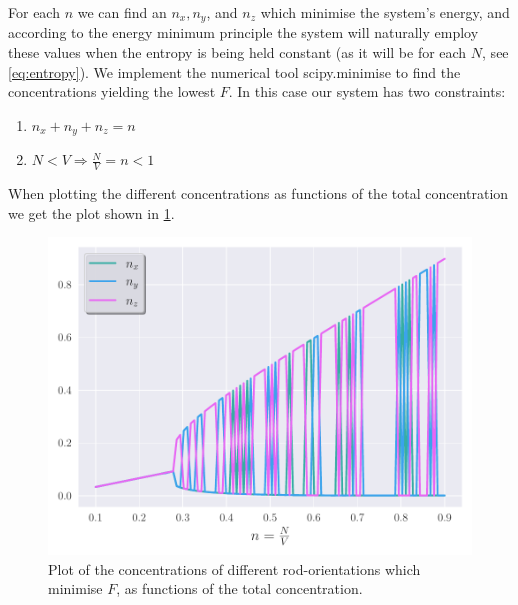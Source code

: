     For each $n$ we can find an $n_x, n_y$, and $n_z$ which minimise the system's energy, and according to the energy minimum principle the system will naturally employ these values when the entropy is being held constant (as it will be for each $N$, see \cref{eq:entropy}). We implement the numerical tool scipy.minimise to find the concentrations yielding the lowest $F$. In this case our system has two constraints:
    \begin{enumerate}
        \item $n_x + n_y + n_z = n$
        \item $ N<V  \Rightarrow \frac{N}{V} = n < 1$
    \end{enumerate}

    When plotting the different concentrations as functions of the total concentration we get the plot shown in \cref{fig:n_vs_xyz}. 
    \begin{figure}
        \centering
        \includegraphics[width=.7\textwidth]{./figs/n_vs_xyz.pdf}
        \caption{Plot of the concentrations of different rod-orientations which minimise $F$, as functions of the total concentration.}
        \label{fig:n_vs_xyz}
    \end{figure}
    
